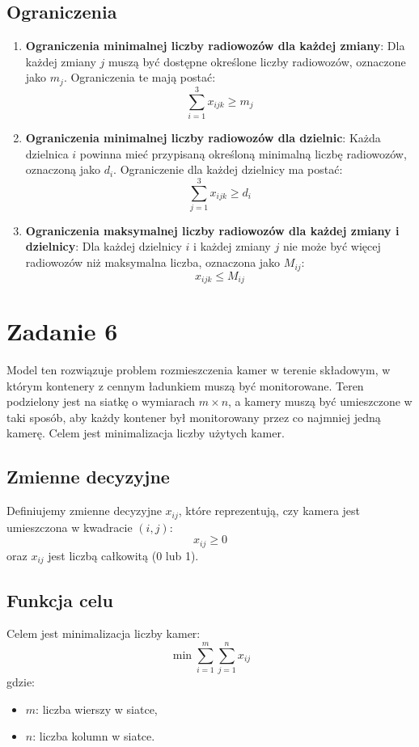\documentclass[12pt, letterpaper]{article}
\begin{document}
\subsection*{Ograniczenia}
\begin{enumerate}
  \item \textbf{Ograniczenia minimalnej liczby radiowozów dla każdej zmiany}:
        Dla każdej zmiany \( j \) muszą być dostępne określone liczby
        radiowozów, oznaczone jako \( m_j \). Ograniczenia te mają postać:
        \[
          \sum_{i=1}^{3} x_{ijk} \geq m_j
        \]

  \item \textbf{Ograniczenia minimalnej liczby radiowozów dla dzielnic}:
        Każda dzielnica \( i \) powinna mieć przypisaną określoną minimalną
        liczbę radiowozów, oznaczoną jako \( d_i \). Ograniczenie dla każdej dzielnicy
        ma postać:
        \[
          \sum_{j=1}^{3} x_{ijk} \geq d_i
        \]

  \item \textbf{Ograniczenia maksymalnej liczby radiowozów dla każdej zmiany i
          dzielnicy}:
        Dla każdej dzielnicy \( i \) i każdej zmiany \( j \) nie może być
        więcej radiowozów niż maksymalna liczba, oznaczona jako \( M_{ij} \):
        \[
          x_{ijk} \leq M_{ij}
        \]
\end{enumerate}

\section{Zadanie 6}

Model ten rozwiązuje problem rozmieszczenia kamer w terenie składowym, w którym
kontenery z cennym ładunkiem muszą być monitorowane. Teren podzielony jest na
siatkę o wymiarach \( m \times n \), a kamery muszą być umieszczone w taki
sposób, aby każdy kontener był monitorowany przez co najmniej jedną kamerę.
Celem jest minimalizacja liczby użytych kamer.

\subsection*{Zmienne decyzyjne}
Definiujemy zmienne decyzyjne \( x_{ij} \), które reprezentują, czy kamera jest
umieszczona w kwadracie \( (i, j) \):
\[
  x_{ij} \geq 0
\]
oraz \( x_{ij} \) jest liczbą całkowitą (0 lub 1).

\subsection*{Funkcja celu}
Celem jest minimalizacja liczby kamer:
\[
  \min \sum_{i=1}^{m} \sum_{j=1}^{n} x_{ij}
\]
gdzie:
\begin{itemize}
  \item \( m \): liczba wierszy w siatce,
  \item \( n \): liczba kolumn w siatce.
\end{itemize}
\end{document}
